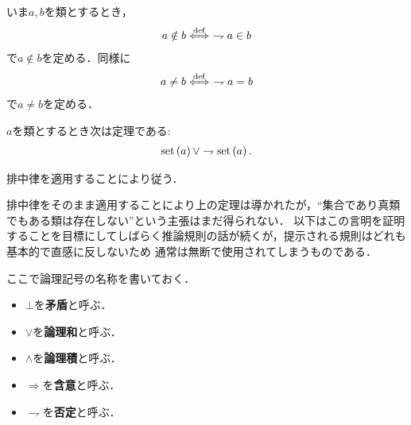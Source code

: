 	
	いま$a,b$を類とするとき，
	\begin{align}
		a \notin b \overset{\mathrm{def}}{\Longleftrightarrow}\ \rightharpoondown a \in b
	\end{align}
	で$a \notin b$を定める．同様に
	\begin{align}
		a \neq b \overset{\mathrm{def}}{\Longleftrightarrow}\ \rightharpoondown a = b
	\end{align}
	で$a \neq b$を定める．
	
	
	\begin{screen}
		\begin{thm}[類は集合であるか真類であるかのいずれかに定まる]
			$a$を類とするとき次は定理である:
			\begin{align}
				\operatorname*{set} \left(a\right) \vee \rightharpoondown \operatorname*{set} \left(a\right).
			\end{align}
		\end{thm}
	\end{screen}
	
	\begin{prf}
		排中律を適用することにより従う．
		\QED
	\end{prf}
	
	排中律をそのまま適用することにより上の定理は導かれたが，``集合であり真類でもある類は存在しない''という主張はまだ得られない．
	以下はこの言明を証明することを目標にしてしばらく推論規則の話が続くが，提示される規則はどれも基本的で直感に反しないため
	通常は無断で使用されてしまうものである．
	
	ここで論理記号の名称を書いておく．
	\begin{itemize}
		\item $\bot$を{\bf 矛盾}と呼ぶ．
		\item $\vee$を{\bf 論理和}と呼ぶ．
		\item $\wedge$を{\bf 論理積}と呼ぶ．
		\item $\Longrightarrow$を{\bf 含意}と呼ぶ．
		\item $\rightharpoondown$を{\bf 否定}と呼ぶ．
	\end{itemize}
	
